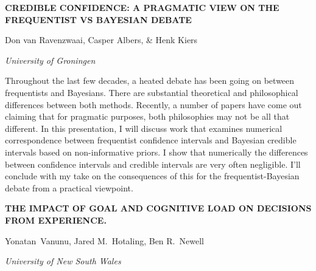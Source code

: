 \documentclass[]{article}
\begin{document}
\textbf{CREDIBLE CONFIDENCE: A PRAGMATIC VIEW ON THE FREQUENTIST VS
BAYESIAN DEBATE}

Don van Ravenzwaai, Casper Albers, \& Henk Kiers

\emph{University of Groningen }

Throughout the last few decades, a heated debate has been going on
between frequentists and Bayesians. There are substantial theoretical
and philosophical differences between both methods. Recently, a number
of papers have come out claiming that for pragmatic purposes, both
philosophies may not be all that different. In this presentation, I will
discuss work that examines numerical correspondence between frequentist
confidence intervals and Bayesian credible intervals based on
non-informative priors. I show that numerically the differences between
confidence intervals and credible intervals are very often negligible.
I'll conclude with my take on the consequences of this for the
frequentist-Bayesian debate from a practical viewpoint.

\textbf{THE IMPACT OF GOAL AND COGNITIVE LOAD ON DECISIONS FROM
EXPERIENCE.}

Yonatan~Vanunu, Jared M.~Hotaling, Ben R.~Newell

\emph{University of New South Wales}
\end{document}
